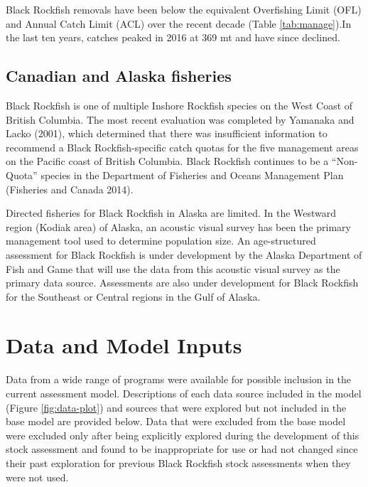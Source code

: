 \documentclass[11pt,
  letterpaper,
]{article}
\begin{document}
Black Rockfish removals have been below the equivalent Overfishing Limit (OFL) and Annual Catch Limit (ACL) over the recent decade (Table \ref{tab:manage}).In the last ten years, catches peaked in 2016 at 369 mt and have since declined.

\hypertarget{canadian-and-alaska-fisheries}{%
\subsection{Canadian and Alaska fisheries}\label{canadian-and-alaska-fisheries}}

Black Rockfish is one of multiple Inshore Rockfish species on the West Coast of British Columbia. The most recent evaluation was completed by Yamanaka and Lacko (2001), which determined that there was insufficient information to recommend a Black Rockfish-specific catch quotas for the five management areas on the Pacific coast of British Columbia. Black Rockfish continues to be a ``Non-Quota'' species in the Department of Fisheries and Oceans Management Plan (Fisheries and Canada 2014).

Directed fisheries for Black Rockfish in Alaska are limited. In the Westward region (Kodiak area) of Alaska, an acoustic visual survey has been the primary management tool used to determine population size. An age-structured assessment for Black Rockfish is under development by the Alaska Department of Fish and Game that will use the data from this acoustic visual survey as the primary data source. Assessments are also under development for Black Rockfish for the Southeast or Central regions in the Gulf of Alaska.

\hypertarget{data-and-model-inputs}{%
\section{Data and Model Inputs}\label{data-and-model-inputs}}

Data from a wide range of programs were available for possible inclusion in the current assessment model. Descriptions of each data source included in the model (Figure \ref{fig:data-plot}) and sources that were explored but not included in the base model are provided below. Data that were excluded from the base model were excluded only after being explicitly explored during the development of this stock assessment and found to be inappropriate for use or had not changed since their past exploration for previous Black Rockfish stock assessments when they were not used.
\end{document}

